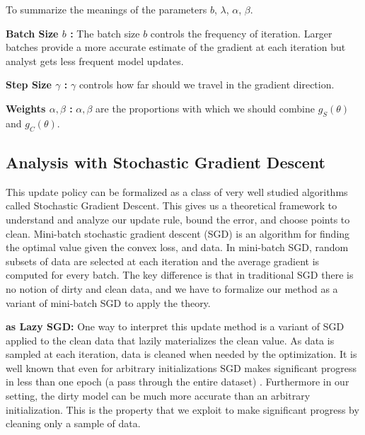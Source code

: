 \noindent To summarize the meanings of the parameters $b$, $\lambda$, $\alpha$, $\beta$.

\vspace{0.25em}

\noindent\textbf{Batch Size $b$ : } The batch size $b$ controls the frequency of iteration. Larger batches provide a more accurate estimate of the gradient at each iteration but analyst gets less frequent model updates. 

\vspace{0.25em}

\noindent\textbf{Step Size $\gamma$ : } $\gamma$ controls how far should we travel in the gradient direction.

\vspace{0.25em}

\noindent\textbf{Weights $\alpha,\beta$ : } $\alpha,\beta$ are the proportions with which we should combine $g_S(\theta)$ and $g_C(\theta)$. 

\subsection{Analysis with Stochastic Gradient Descent}\label{sgd}
This update policy can be formalized as a class of very well studied algorithms called Stochastic Gradient Descent.
This gives us a theoretical framework to understand and analyze our update rule, bound the error, and choose points to clean.
Mini-batch stochastic gradient descent (SGD) is an algorithm for finding the optimal value
given the convex loss, and data.
In mini-batch SGD, random subsets of data are selected at each iteration and the average gradient is computed for every batch.
The key difference is that in traditional SGD there is no notion of dirty and clean data, and we have to formalize our method as a variant of mini-batch SGD to apply the theory.

\vspace{0.25em}

\noindent\textbf{ \sys as Lazy SGD: } One way to interpret this update method is a variant of SGD applied to the clean data that lazily materializes the clean value.
As data is sampled at each iteration, data is cleaned when needed by the optimization.
It is well known that even for arbitrary initializations SGD makes significant progress in less than one epoch (a pass through the entire dataset) \cite{bottou2012stochastic}.
Furthermore in our setting, the dirty model can be much more accurate than an arbitrary initialization.
This is the property that we exploit to make significant progress by cleaning only a sample of data.

